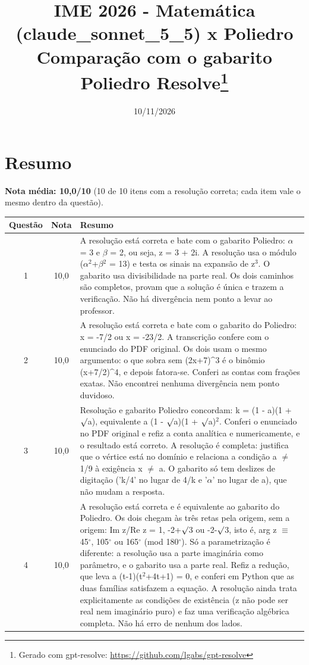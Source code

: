 \documentclass{article}%
\title{IME 2026 {-} Matemática (claude\_sonnet\_5\_5) x Poliedro\\[4pt]\large Comparação com o gabarito Poliedro Resolve\thanks{Gerado com gpt-resolve: \url{https://github.com/lgabs/gpt-resolve}}}%
\date{10/11/2026}%
\begin{document}
%
\normalsize%
\maketitle%
\section*{Resumo}\textbf{Nota média: 10,0/10} (10 de 10 itens com a resolução correta; cada item vale o mesmo dentro da questão).\par\medskip%
\begin{longtable}{@{}c c p{}@{}}\toprule Questão & Nota & Resumo \\ \midrule
1 & 10,0 & A resolução está correta e bate com o gabarito Poliedro: $\alpha$ = 3 e $\beta$ = 2, ou seja, z = 3 + 2i. A resolução usa o módulo ($\alpha$$^2$+$\beta$$^2$ = 13) e testa os sinais na expansão de z$^3$. O gabarito usa divisibilidade na parte real. Os dois caminhos são completos, provam que a solução é única e trazem a verificação. Não há divergência nem ponto a levar ao professor. \\
2 & 10,0 & A resolução está correta e bate com o gabarito do Poliedro: x = {-}7/2 ou x = {-}23/2. A transcrição confere com o enunciado do PDF original. Os dois usam o mesmo argumento: o que sobra sem (2x+7)\^{}3 é o binômio (x+7/2)\^{}4, e depois fatora{-}se. Conferi as contas com frações exatas. Não encontrei nenhuma divergência nem ponto duvidoso. \\
3 & 10,0 & Resolução e gabarito Poliedro concordam: k = (1 - a)(1 + $\surd$a), equivalente a (1 - $\surd$a)(1 + $\surd$a)$^2$. Conferi o enunciado no PDF original e refiz a conta analítica e numericamente, e o resultado está correto. A resolução é completa: justifica que o vértice está no domínio e relaciona a condição a $\neq$ 1/9 à exigência x $\neq$ a. O gabarito só tem deslizes de digitação ('k/4' no lugar de 4/k e '$\alpha$' no lugar de a), que não mudam a resposta. \\
4 & 10,0 & A resolução está correta e é equivalente ao gabarito do Poliedro. Os dois chegam às três retas pela origem, sem a origem: Im z/Re z = 1, -2+$\surd$3 ou -2-$\surd$3, isto é, arg z $\equiv$ 45$^\circ$, 105$^\circ$ ou 165$^\circ$ (mod 180$^\circ$). Só a parametrização é diferente: a resolução usa a parte imaginária como parâmetro, e o gabarito usa a parte real. Refiz a redução, que leva a (t-1)(t$^2$+4t+1) = 0, e conferi em Python que as duas famílias satisfazem a equação. A resolução ainda trata explicitamente as condições de existência (z não pode ser real nem imaginário puro) e faz uma verificação algébrica completa. Não há erro de nenhum dos lados. \\

\end{longtable}
\end{document}
